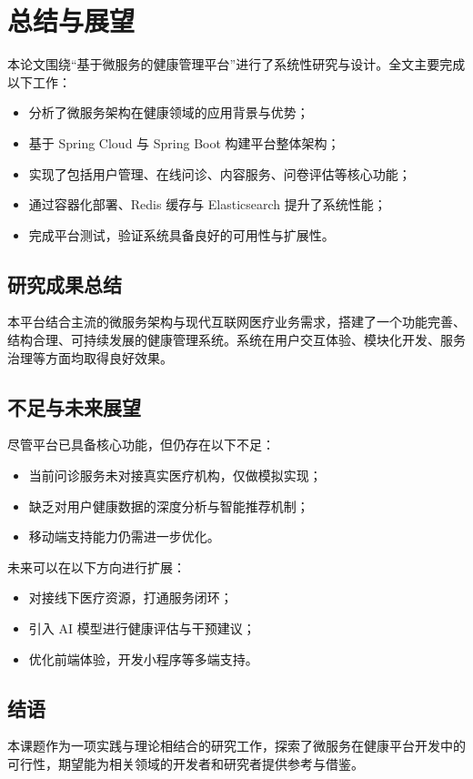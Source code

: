 \section{总结与展望}

本论文围绕“基于微服务的健康管理平台”进行了系统性研究与设计。全文主要完成以下工作：

\begin{itemize}
  \item 分析了微服务架构在健康领域的应用背景与优势；
  \item 基于 Spring Cloud 与 Spring Boot 构建平台整体架构；
  \item 实现了包括用户管理、在线问诊、内容服务、问卷评估等核心功能；
  \item 通过容器化部署、Redis 缓存与 Elasticsearch 提升了系统性能；
  \item 完成平台测试，验证系统具备良好的可用性与扩展性。
\end{itemize}

\subsection{研究成果总结}

本平台结合主流的微服务架构与现代互联网医疗业务需求，搭建了一个功能完善、结构合理、可持续发展的健康管理系统。系统在用户交互体验、模块化开发、服务治理等方面均取得良好效果。

\subsection{不足与未来展望}

尽管平台已具备核心功能，但仍存在以下不足：

\begin{itemize}
  \item 当前问诊服务未对接真实医疗机构，仅做模拟实现；
  \item 缺乏对用户健康数据的深度分析与智能推荐机制；
  \item 移动端支持能力仍需进一步优化。
\end{itemize}

未来可以在以下方向进行扩展：

\begin{itemize}
  \item 对接线下医疗资源，打通服务闭环；
  \item 引入 AI 模型进行健康评估与干预建议；
  \item 优化前端体验，开发小程序等多端支持。
\end{itemize}

\subsection{结语}

本课题作为一项实践与理论相结合的研究工作，探索了微服务在健康平台开发中的可行性，期望能为相关领域的开发者和研究者提供参考与借鉴。
